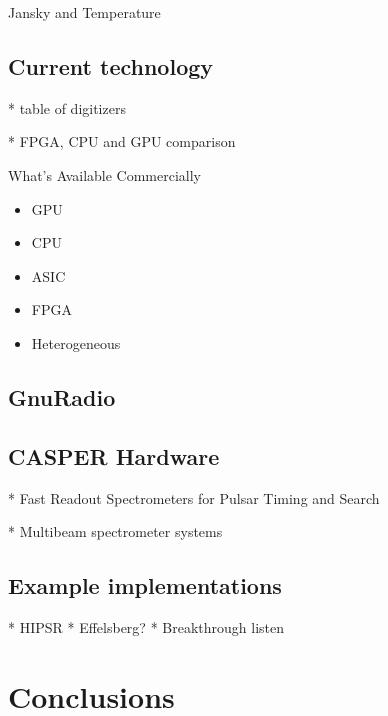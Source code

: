 \documentclass{ws-rv961x669}
\begin{document}
Jansky and Temperature 


\subsection{Current technology}

* table of digitizers

* FPGA, CPU and GPU comparison

What's Available Commercially

\begin{itemize}
	\item GPU
    \item CPU
    \item ASIC
    \item FPGA
    \item Heterogeneous	
\end{itemize}


\subsection{GnuRadio}

\subsection{CASPER Hardware}

* Fast Readout Spectrometers for Pulsar Timing and Search

* Multibeam spectrometer systems


\subsection{Example implementations}

* HIPSR
* Effelsberg?
* Breakthrough listen

\section{Conclusions}
\end{document}
